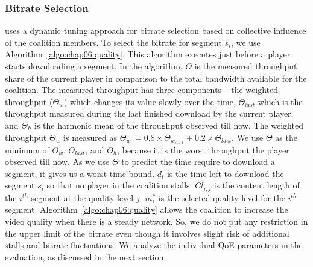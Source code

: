 \subsubsection{Bitrate Selection}
{\our} uses a dynamic tuning approach for bitrate selection based on collective influence of the coalition members. To select the bitrate for segment $s_i$, we use Algorithm~\ref{algo:chap06:quality}. This algorithm executes just before a player starts downloading a segment. In the algorithm, $\varTheta$ is the measured throughput share of the current player in comparison to the total bandwidth available for the coalition. The measured throughput has three components -- the weighted throughput ($\varTheta_w$) which changes its value slowly over the time,  $\varTheta_{last}$ which is the throughput measured during the last finished download by the current player, and $\varTheta_h$ is the harmonic mean of the throughput observed till now. The weighted throughput $\varTheta_{w}$ is measured as $\varTheta_{w_i} = 0.8 \times \varTheta_{w_{i-1}} + 0.2 \times \varTheta_{last}$. We use $\varTheta$ as the minimum of $\varTheta_w$, $\varTheta_{last}$, and $\varTheta_h$, because it is the worst throughput the player observed till now. As we use $\varTheta$ to predict the time require to download a segment, it gives us a worst time bound. $d_t$ is the time left to download the segment $s_i$ so that no player in the coalition stalls. $Cl_{i,j}$ is the content length of the $i^{th}$ segment at the quality level $j$. $m^*_i$ is the selected quality level for the $i^{th}$ segment. Algorithm~\ref{algo:chap06:quality} allows the coalition to increase the video quality when there is a steady network. So, we do not put any restriction in the upper limit of the bitrate even though it involves slight risk of additional stalls and bitrate fluctuations. We analyze the individual QoE parameters in the evaluation, as discussed in the next section.